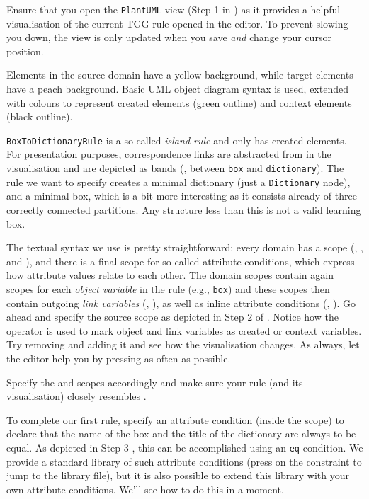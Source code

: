 \begin{stepbystep}
\item  Ensure that you open the \texttt{PlantUML} view (Step 1 in ) as it provides a helpful visualisation of the current TGG rule opened in the editor.
To prevent slowing you down, the view is only updated when you save \emph{and} change your cursor position.

Elements in the source domain have a yellow background, while target elements have a peach background.
Basic UML object diagram syntax is used, extended with colours to represent created elements (green outline) and context elements (black outline).

\texttt{BoxToDictionaryRule} is a so-called \emph{island rule} and only has created elements.
For presentation purposes, correspondence links are abstracted from in the visualisation and are depicted as bands (\eg, between \texttt{box} and \texttt{dictionary}).
The rule we want to specify creates a minimal dictionary (just a \texttt{Dictionary} node), and a minimal box, which is a bit more interesting as it consists already of three correctly connected partitions.
Any structure less than this is not a valid learning box.

\item The textual syntax we use is pretty straightforward:  every domain has a scope (, , and ), and there is a final scope for so called attribute conditions, which express how attribute values relate to each other.
The domain scopes contain again scopes for each \emph{object variable} in the rule (e.g., \texttt{box}) and these scopes then contain outgoing \emph{link variables} (\eg, ), as well as inline attribute conditions (\eg, ).
Go ahead and specify the source scope as depicted in Step 2 of .
Notice how the \moslTggCode{++} operator is used to mark object and link variables as created or context variables.
Try removing and adding it and see how the visualisation changes.  
As always, let the editor help you by pressing  as often as possible.

\item Specify the  and  scopes accordingly and make sure your rule (and its visualisation) closely resembles .

\item To complete our first rule, specify an attribute condition (inside the  scope) to declare that the name of the box and the title of the dictionary are always to be equal.
As depicted in Step 3 , this can be accomplished using an \texttt{eq} condition.
We provide a standard library of such attribute conditions (press  on the constraint to jump to the library file), but it is also possible to extend this library with your own attribute conditions.
We'll see how to do this in a moment.
\end{stepbystep}

